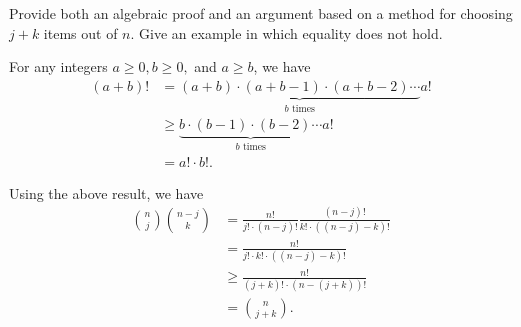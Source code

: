 \begin{enumerate}
{Provide both an algebraic proof and an argument based on a method for choosing
$j + k$ items out of $n$. Give an example in which equality does not hold.
}

\begin{framed}
For any integers $a \ge 0, b \ge 0,$ and $a \ge b$, we have
\begin{equation*}
\begin{aligned}
  (a + b)! &=   \underbrace{(a + b) \cdot (a + b - 1) \cdot (a + b - 2) \cdots}_\text{$b$ times} a!\\
           &\ge \underbrace{b \cdot (b - 1) \cdot (b - 2) \cdots}_\text{$b$ times} a!\\
           &=   a! \cdot b!.
\end{aligned}
\end{equation*}

Using the above result, we have
\begin{equation*}
\begin{aligned}
  \binom{n}{j} \binom{n - j}{k} &=   \frac{n!}{j! \cdot (n - j)!} \frac{(n - j)!}{k! \cdot ((n - j) - k)!}\\
                                &=   \frac{n!}{j! \cdot k! \cdot ((n - j) - k)!}\\
                                &\ge \frac{n!}{(j + k)! \cdot (n - (j + k))!}\\
                                &=   \binom{n}{j + k}.
\end{aligned}
\end{equation*}


\end{framed}
\end{enumerate}

